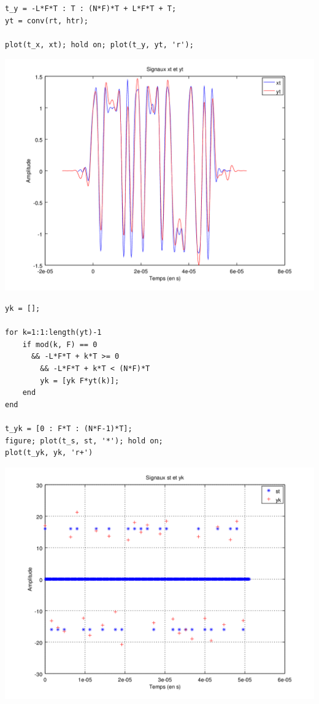 \documentclass{acm_proc_article-sp}
\begin{document}
\begin{lstlisting}
t_y = -L*F*T : T : (N*F)*T + L*F*T + T;
yt = conv(rt, htr);

plot(t_x, xt); hold on; plot(t_y, yt, 'r');
\end{lstlisting}

\begin{center}
\includegraphics[scale=0.45]{yt_13.png}
\end{center}

\begin{lstlisting}
yk = [];

for k=1:1:length(yt)-1
    if mod(k, F) == 0 
      && -L*F*T + k*T >= 0 
        && -L*F*T + k*T < (N*F)*T
        yk = [yk F*yt(k)];
    end
end

t_yk = [0 : F*T : (N*F-1)*T];
figure; plot(t_s, st, '*'); hold on;
plot(t_yk, yk, 'r+')
\end{lstlisting}

\begin{center}
\includegraphics[scale=0.45]{yk_13.png}
\end{center}
\end{document}
